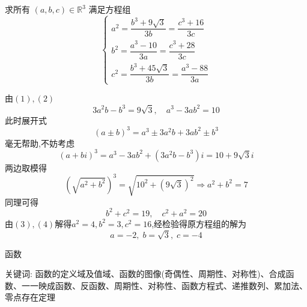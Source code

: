 \begin{questions}
    \question 求所有 $(a, b, c) \in \mathbb{R}^3$ 满足方程组
    \[
    \begin{cases}
    a^2 = \dfrac{b^3 + 9\sqrt{3}}{3b} = \dfrac{c^3 + 16}{3c} \\[6pt]
    b^2 = \dfrac{a^3 - 10}{3a} = \dfrac{c^3 + 28}{3c} \\[6pt]
    c^2 = \dfrac{b^3 + 45\sqrt{3}}{3b} = \dfrac{a^3 - 88}{3a}
    \end{cases}
    \]
    \begin{solution}
        由$(1),(2)$
        \[
        3a^2b-b^3=9\sqrt{3}, \quad a^3-3ab^2=10
        \]
        此时展开式
        \[
        (a\pm b)^3=a^3 \pm 3a^2b + 3ab^2 \pm b^3
        \]
        毫无帮助,不妨考虑
        \[
        (a+bi)^3=a^3-3ab^2+(3a^2b-b^3)i=10+9\sqrt{3}i
        \]
        两边取模得
        \[
        (\sqrt{a^2+b^2})^3=\sqrt{10^2+(9\sqrt{3})^2} \Rightarrow a^2+b^2=7 \tag{3}
        \]
        同理可得
        \[
        b^2+c^2=19,\quad c^2+a^2=20 \tag{4}
        \]
        由$(3),(4)$解得$a^2=4,b^2=3,c^2=16$,经检验得原方程组的解为
        \[
        a=-2,\;b=\sqrt{3},\;c=-4
        \]
    \end{solution}
\end{questions}

\pagebreak

\begin{center}
  {\fontsize{30pt}{26pt}\selectfont
    \hypertarget{函数}{函数} \label{函数}
  }
\end{center}
\separator
\begin{center}
    关键词: 函数的定义域及值域、函数的图像(奇偶性、周期性、对称性)、合成函数、一一映成函数、反函数、周期性、对称性、函数方程式、递推数列、累加法、零点存在定理
\end{center}
\vspace{0.5pt}

